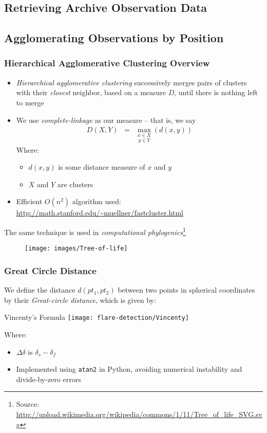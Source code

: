 \subsection{Retrieving Archive Observation Data}
\subsection{Agglomerating Observations by Position}

\begin{frame}[allowframebreaks]
\frametitle{Hierarchical Agglomerative Clustering Overview}
\begin{itemize}
	\item \emph{Hierarchical agglomerative clustering} successively merges pairs of clusters with their \emph{closest} neighbor, based on a measure $D$, until there is nothing left to merge
	\item We use \emph{complete-linkage} as our measure -- that is, we say
\begin{eqnarray*}
  D (X, Y) & = & \underset{y \in Y}{\underset{x \in X}{\max}} (d (x, y))
\end{eqnarray*}
	Where:
	\begin{itemize}
		\item $d(x,y)$ is some distance measure of $x$ and $y$
		\item $X$ and $Y$ are clusters
	\end{itemize}
	\item Efficient $O(n^2)$ algorithm used:\\
	{\small \url{http://math.stanford.edu/~muellner/fastcluster.html}}
\end{itemize}
\framebreak
	The same technique is used in \emph{computational phylogenics}\footnote{Source: \url{http://upload.wikimedia.org/wikipedia/commons/1/11/Tree_of_life_SVG.svg}}
\begin{figure}[h,b]
\centering
\texttt{[image: images/Tree-of-life]}
\end{figure}
\end{frame}
	
\begin{frame}
\frametitle{Great Circle Distance}
	We define the distance $d(pt_1,pt_2)$ between two points in spherical coordinates by their \emph{Great-circle distance}, which is given by:
\begin{block}{Vincenty's Formula}
\texttt{[image: flare-detection/Vincenty]}
\end{block}

Where:
\begin{itemize}
\item $\Delta \delta$ is $\delta_s-\delta_f$
\item Implemented using \texttt{atan2} in Python, avoiding numerical instability and divide-by-zero errors
\end{itemize}
\end{frame}
